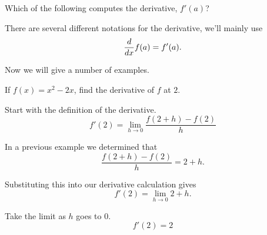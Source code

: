 \documentclass{ximera}
\begin{document}
\begin{question} 
    Which of the following computes the derivative, $f'(a)$?
    \begin{multipleResponse}
    \end{multipleResponse}
\end{question}


\begin{definition}
	There are several different notations for the derivative, we'll mainly
	use
	\[ \frac{d}{dx} f(a) = f'(a). \]
\end{definition}


Now we will give a number of examples.
\begin{example}
	If $f(x) = x^2-2x$, find the derivative of $f$ at $2$.
	\begin{explanation}
		Start with the definition of the derivative.
		\[ f'(2) = \lim_{h\to 0} \frac{f(2+h)-f(2)}{h} \] 

		In a previous example we determined that
		\[ \frac{f(2+h)-f(2)}{h} = 2+h. \]

		Substituting this into our derivative calculation gives
		\[ f'(2) = \lim_{h\to 0} 2+h. \]

		Take the limit as $h$ goes to $0$. 
		\[ f'(2) = 2 \]
\end{explanation}
\end{example}
\end{document}
